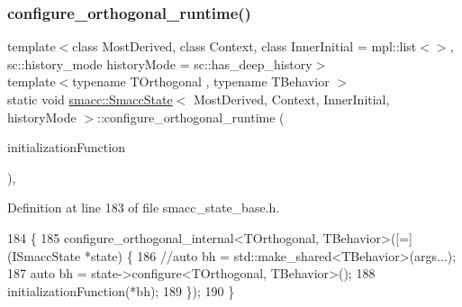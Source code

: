 \subsubsection{\texorpdfstring{configure\+\_\+orthogonal\+\_\+runtime()}{configure\_orthogonal\_runtime()}\hspace{0.1cm}{\footnotesize\ttfamily [2/2]}}
{\footnotesize\ttfamily template$<$class Most\+Derived, class Context, class Inner\+Initial = mpl\+::list$<$$>$, sc\+::history\+\_\+mode history\+Mode = sc\+::has\+\_\+deep\+\_\+history$>$ \\
template$<$typename T\+Orthogonal , typename T\+Behavior $>$ \\
static void \hyperlink{classsmacc_1_1SmaccState}{smacc\+::\+Smacc\+State}$<$ Most\+Derived, Context, Inner\+Initial, history\+Mode $>$\+::configure\+\_\+orthogonal\+\_\+runtime (\begin{DoxyParamCaption}\item[{std\+::function$<$ void(T\+Behavior \&bh)$>$}]{initialization\+Function }\end{DoxyParamCaption})\hspace{0.3cm}{\ttfamily [inline]}, {\ttfamily [static]}}



Definition at line 183 of file smacc\+\_\+state\+\_\+base.\+h.


\begin{DoxyCode}
184     \{
185       configure\_orthogonal\_internal<TOrthogonal, TBehavior>([=](ISmaccState *state) \{
186         \textcolor{comment}{//auto bh = std::make\_shared<TBehavior>(args...);}
187         \textcolor{keyword}{auto} bh = state->configure<TOrthogonal, TBehavior>();
188         initializationFunction(*bh);
189       \});
190     \}
\end{DoxyCode}
\mbox{\label{classsmacc_1_1SmaccState_aac23d8a6909f75c5e5fca2a7c09b5368}} 
